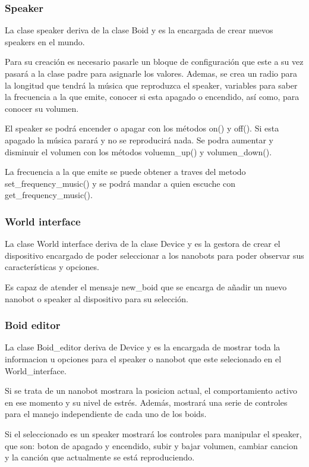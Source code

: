 \subsubsection{Speaker}
\label{sec:speaker}

La clase speaker deriva de la clase Boid y es la encargada de crear nuevos speakers en el mundo.

Para su creación es necesario pasarle un bloque de configuración que este a su vez pasará a la clase padre para asignarle los valores. Ademas, se crea un radio para la longitud que tendrá la música que reproduzca el speaker, variables para saber la frecuencia a la que emite, conocer si esta apagado o encendido, así como, para conocer su volumen.

El speaker se podrá encender o apagar con los métodos on() y off(). Si esta apagado la música parará y no se reproducirá nada. Se podra aumentar y disminuir el volumen con los métodos voluemn\_up() y volumen\_down().

La frecuencia a la que emite se puede obtener a traves del metodo set\_frequency\_music() y se podrá mandar a quien escuche con get\_frequency\_music().

\subsubsection{World interface}
\label{sec:world_interface}
La clase World interface deriva de la clase Device y es la gestora de crear el dispositivo encargado de poder seleccionar a los nanobots para poder observar sus características y opciones.

Es capaz de atender el mensaje new\_boid que se encarga de añadir un nuevo nanobot o speaker al dispositivo para su selección. 

\subsubsection{Boid editor}
\label{sec:boid_editor}
La clase Boid\_editor deriva de Device y es la encargada de mostrar toda la informacion u opciones para el speaker o nanobot que este selecionado en el World\_interface. 

Si se trata de un nanobot mostrara la posicion actual, el comportamiento activo en ese momento y su nivel de estrés. Además, mostrará una serie de controles para el manejo independiente de cada uno de los boids.

Si el seleccionado es un speaker mostrará los controles para manipular el speaker, que son: boton de apagado y encendido, subir y bajar volumen, cambiar cancion y la canción que actualmente se está reproduciendo.  

